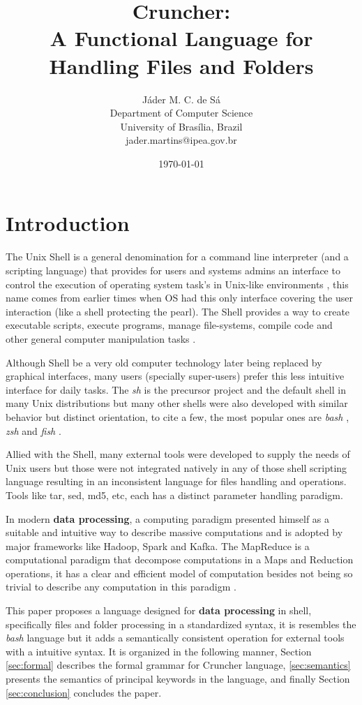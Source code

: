 \documentclass{article}
\title{Cruncher:\\
\large A Functional Language for Handling Files and Folders}
\author{Jáder M. C. de Sá \\
        Department of Computer Science\\
        University of Brasília, Brazil \\
        jader.martins@ipea.gov.br}
\date{\today}
\begin{document}
\maketitle

\section{Introduction}
\label{sec:intro}
The Unix Shell is a general denomination for a command line interpreter
(and a scripting language) that provides for users and systems admins an
interface to control the execution of operating system task's in Unix-like
environments \cite{negus2010linux}, this name comes from earlier times
when OS had this only interface covering the user interaction (like a shell
protecting the pearl). The Shell provides a way to create executable scripts,
execute programs, manage file-systems, compile code and other general computer
manipulation tasks \cite{negus2010linux,blum2008linux}.

Although Shell be a very old computer technology later being replaced by
graphical interfaces, many users (specially super-users) prefer this less
intuitive interface \cite{newham2005learning} for daily tasks. The \textit{sh}
is the precursor project and the default shell in many Unix distributions but
many other shells were also developed with similar behavior but distinct
orientation, to cite a few, the most popular ones are \textit{bash}
\cite{bash}, \textit{zsh} \cite{zsh} and \textit{fish} \cite{fish}.

Allied with the Shell, many external tools were developed to supply the needs
of Unix users \cite{negus2010linux} but those were not integrated natively in
any of those shell scripting language resulting in an inconsistent language for
files handling and operations. Tools like tar, sed, md5, etc, each has a
distinct parameter handling paradigm.

In modern \textbf{data processing}, a computing paradigm presented himself
as a suitable and intuitive way to describe massive computations and is
adopted by major frameworks like Hadoop, Spark and Kafka. The MapReduce
is a computational paradigm that decompose computations in a Maps and
Reduction operations, it has a clear and efficient model of computation
besides not being so trivial to describe any computation in this paradigm
\cite{afrati2012vision}.

This paper proposes a language designed for \textbf{data processing} in
shell, specifically files and folder processing in a standardized syntax,
it is resembles the \textit{bash} language but it adds a semantically
consistent operation for external tools with a intuitive syntax. It is
organized in the following manner, Section \ref{sec:formal} describes the
formal grammar for Cruncher language, \ref{sec:semantics} presents the
semantics of principal keywords in the language, and finally Section
\ref{sec:conclusion} concludes the paper.
\end{document}

